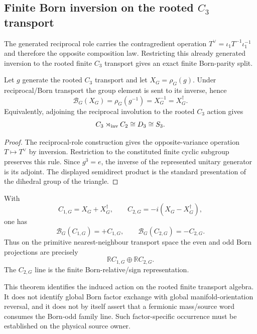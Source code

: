 \documentclass[12pt,a4paper]{article}
\begin{document}
\subsection{Finite Born inversion on the rooted \texorpdfstring{$C_3$}{C3} transport}
\label{p2c:sec:v269-born-rooted-c3}

The generated reciprocal role carries the contragredient operation
$T^\vee=\iota_1T^{-1}\iota_1^{-1}$ and therefore the opposite composition
law.  Restricting this already generated inversion to the rooted finite
$C_3$ transport gives an exact finite Born-parity split.

\begin{theorem}
\label{p2c:thm:v269-born-finite-inversion}
Let $g$ generate the rooted $C_3$ transport and let
$X_G=\rho_G(g)$.  Under reciprocal/Born transport the group element is sent
to its inverse, hence
\[
 \boxed{
 \mathcal B_G(X_G)=\rho_G(g^{-1})=X_G^{-1}=X_G^\dagger.}
\]
Equivalently, adjoining the reciprocal involution to the rooted $C_3$ action
gives
\[
 C_3\rtimes_{\rm inv}C_2\cong D_3\cong S_3.
\]
\end{theorem}

\begin{proof}
The reciprocal-role construction gives the opposite-variance operation
$T\mapsto T^\vee$ by inversion.  Restriction to the constituted finite cyclic
subgroup preserves this rule.  Since $g^3=e$, the inverse of the represented
unitary generator is its adjoint.  The displayed semidirect product is the
standard presentation of the dihedral group of the triangle.
\end{proof}

\begin{corollary}
\label{p2c:cor:v269-born-parity-signline}
With
\[
 C_{1,G}=X_G+X_G^\dagger,
 \qquad
 C_{2,G}=-i(X_G-X_G^\dagger),
\]
one has
\[
 \boxed{\mathcal B_G(C_{1,G})=+C_{1,G},\qquad
 \mathcal B_G(C_{2,G})=-C_{2,G}.}
\]
Thus on the primitive nearest-neighbour transport space the even and odd
Born projections are precisely
\[
 \mathbb R C_{1,G}\oplus\mathbb R C_{2,G}.
\]
The $C_{2,G}$ line is the finite Born-relative/sign representation.
\end{corollary}

\begin{remark}
\label{p2c:rem:v269-local-not-global}
This theorem identifies the induced action on the rooted finite transport
algebra.  It does not identify global Born factor exchange with global
manifold-orientation reversal, and it does not by itself assert that a
fermionic mass/source word consumes the Born-odd family line.  Such
factor-specific occurrence must be established on the physical source owner.
\end{remark}
\end{document}
